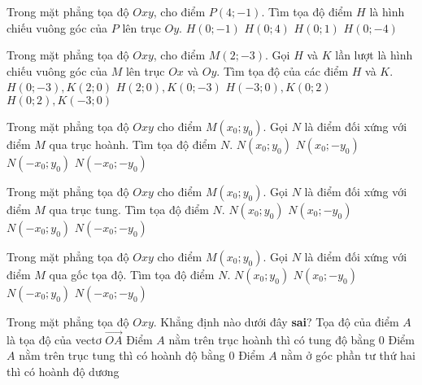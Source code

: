 \begin{ex}%
	Trong mặt phẳng tọa độ $Oxy$, cho điểm $P(4;-1)$. Tìm tọa độ điểm $H$ là hình chiếu vuông góc của $P$ lên trục $Oy$.
	\choice
	{\True $H(0;-1)$}
	{$H(0;4)$}
	{$H(0;1)$}
	{$H(0;-4)$}
\end{ex}

\begin{ex}%
	Trong mặt phẳng tọa độ $Oxy$, cho điểm $M(2;-3)$. Gọi $H$ và $K$ lần lượt là hình chiếu vuông góc của $M$ lên trục $Ox$ và $Oy$. Tìm tọa độ của các điểm $H$ và $K$.
	\choice
	{$H(0;-3), K(2;0)$}
	{\True $H(2;0), K(0;-3)$}
	{$H(-3;0), K(0;2)$}
	{$H(0;2), K(-3;0)$}
\end{ex}

\begin{ex}%
	Trong mặt phẳng tọa độ $Oxy$ cho điểm $M(x_0;y_0)$. Gọi $N$ là điểm đối xứng với điểm $M$ qua trục hoành. Tìm tọa độ điểm $N$. 
	\choice
	{$N(x_0;y_0)$}
	{\True $N(x_0;-y_0)$}
	{$N(-x_0;y_0)$}
	{$N(-x_0;-y_0)$}
\end{ex}

\begin{ex}%
	Trong mặt phẳng tọa độ $Oxy$ cho điểm $M(x_0;y_0)$. Gọi $N$ là điểm đối xứng với điểm $M$ qua trục tung. Tìm tọa độ điểm $N$.
	\choice
	{$N(x_0;y_0)$}
	{$N(x_0;-y_0)$}
	{\True $N(-x_0;y_0)$}
	{$N(-x_0;-y_0)$}
\end{ex}

\begin{ex}%
	Trong mặt phẳng tọa độ $Oxy$ cho điểm $M(x_0;y_0)$.  Gọi $N$ là điểm đối xứng với điểm $M$ qua gốc tọa độ. Tìm tọa độ điểm $N$.
	\choice
	{$N(x_0;y_0)$}
	{$N(x_0;-y_0)$}
	{$N(-x_0;y_0)$}
	{\True $N(-x_0;-y_0)$}
\end{ex}

\begin{ex}%
	Trong mặt phẳng tọa độ $Oxy$. Khẳng định nào dưới đây \textbf{sai}?
	\choice
	{Tọa độ của điểm $A$ là tọa độ của vectơ $\vec{OA}$}
	{Điểm $A$ nằm trên trục hoành thì có tung độ bằng 0}
	{Điểm $A$ nằm trên trục tung thì có hoành độ bằng 0}
	{\True Điểm $A$ nằm ở góc phần tư thứ hai thì có hoành độ dương}
\end{ex}

